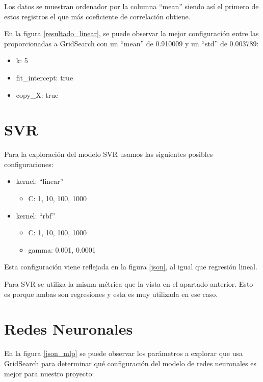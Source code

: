 Los datos se muestran ordenador por la columna ``mean'' siendo así el primero de estos registros el que más coeficiente de correlación obtiene.

En la figura \ref{resultado_linear}, se puede observar la mejor configuración entre las proporcionadas a GridSearch con un ``mean'' de 0.910009 y un ``std'' de 0.003789:

\begin{itemize}
\item k: 5
\item fit\_intercept: true
\item copy\_X: true
\end{itemize} 

\section{SVR}
\label{makereference7.2}

Para la exploración del modelo SVR usamos las siguientes posibles configuraciones:

\begin{itemize}
	\item kernel: ``linear''
	\begin{itemize}
		\item C: 1, 10, 100, 1000
	\end{itemize}
	\item kernel: ``rbf''
	\begin{itemize}
		\item C: 1, 10, 100, 1000
		\item gamma: 0.001, 0.0001
	\end{itemize}
\end{itemize}

Esta configuración viene reflejada en la figura \ref{json}, al igual que regresión lineal.

Para SVR se utiliza la misma métrica que la vista en el apartado anterior. Esto es porque ambas son regresiones y esta es muy utilizada en ese caso.

\section{Redes Neuronales}
\label{makereference7.3}

En la figura \ref{json_mlp} se puede observar los parámetros a explorar que usa GridSearch para determinar qué configuración del modelo de redes neuronales es mejor para nuestro proyecto:

